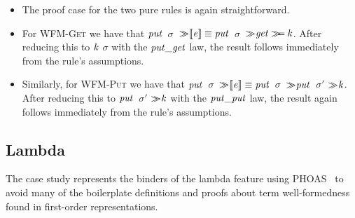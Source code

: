 \begin{itemize}
\item
The proof case for the two pure rules is again straightforward.
\item
For \textsc{WFM-Get} we have that \ensuremath{\Varid{put}}~$\sigma$~\ensuremath{\sequ \llbracket \Varid{e}\rrbracket\equiv \Varid{put}}~$\sigma$~\ensuremath{\sequ \Varid{get}\bind \Varid{k}}. After reducing this to \ensuremath{\Varid{k}} $\sigma$ with the
\ensuremath{\Varid{put\char95 get}} law, the result follows immediately from the rule's assumptions.
\item
Similarly, for \textsc{WFM-Put} we have that \ensuremath{\Varid{put}}~$\sigma$~\ensuremath{\sequ \llbracket \Varid{e}\rrbracket\equiv \Varid{put}}~$\sigma$~\ensuremath{\sequ \Varid{put}}~$\sigma'$ \ensuremath{\sequ \Varid{k}}. After reducing this to \ensuremath{\Varid{put}}~$\sigma'$ \ensuremath{\sequ \Varid{k}} with the \ensuremath{\Varid{put\char95 put}} law, the result again follows immediately from the rule's assumptions.
\end{itemize}



\subsection{Lambda}

The case study represents the binders of the lambda feature using
PHOAS~\cite{PHOAS} to avoid many of the boilerplate definitions and
proofs about term well-formedness found in first-order
representations.

